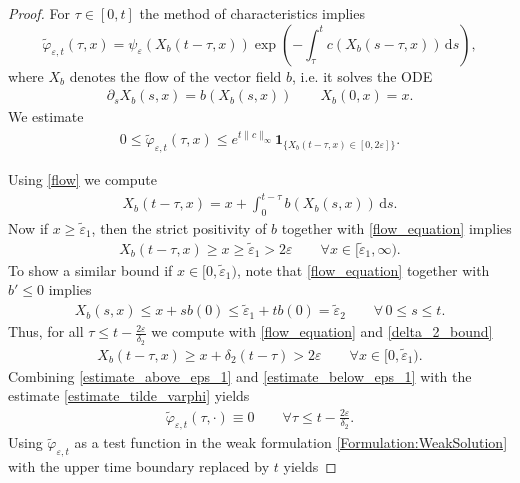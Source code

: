 \documentclass[12pt,a4paper]{amsart}
\newcommand{\ud}{\mathrm{d}}
\begin{document}
\begin{proof}
\noindent For $\tau\in [0,t]$ the method of characteristics implies
\[
\tilde \varphi_{\varepsilon,t}(\tau,x)
=
\psi_\varepsilon(X_b(t-\tau,x))
\exp\!\left(
-\int_\tau^t
c(X_b(s-\tau,x))\,\ud s
\right),
\]
where $X_b$ denotes the flow of the vector field $b$, i.e. it solves the ODE
	\begin{align}
    \label{flow}
	\partial_s X_b(s,x) = b(X_b(s, x)) \quad \quad X_b(0, x) = x.
	\end{align}
We estimate
\begin{align}
\label{estimate_tilde_varphi}
0\le
\tilde \varphi_{\varepsilon,t}(\tau,x)
\le
e^{t\|c\|_\infty}
\mathbf 1_{\{X_b(t-\tau,x)\in[0,2\varepsilon]\}}.
\end{align}

\noindent
Using \eqref{flow} we compute
\begin{align}
\label{flow_equation}
X_b(t-\tau,x)=x+\int_0^{t-\tau}b(X_b(s,x))\,\ud s.
\end{align}
Now if $x\geq\tilde \varepsilon_1$, then the strict positivity of $b$ together with \eqref{flow_equation} implies 
    \begin{align}
    \label{estimate_above_eps_1}
        X_b(t-\tau,x)\geq x\geq\tilde \varepsilon_1>2\varepsilon\qquad \forall x\in [\tilde\varepsilon_1,\infty).
    \end{align}
To show a similar bound if  $x\in[0,\tilde\varepsilon_1)$, note that  \eqref{flow_equation}  together with $b'\leq 0$ implies 
\begin{align*}
    X_b(s,x)\leq x+sb(0)\leq \tilde \varepsilon_1+tb(0)=\tilde \varepsilon_2\qquad \forall \,0\leq s\leq t.
    \end{align*}
Thus, for all $\tau\leq t-\frac {2\varepsilon}{\delta_2}$ we compute with \eqref{flow_equation} and \eqref{delta_2_bound}
\begin{align}
\label{estimate_below_eps_1}
X_b(t-\tau,x)\ge x+\delta_2(t-\tau)>2\varepsilon\qquad \forall x\in [0,\tilde \varepsilon_1).
\end{align}
Combining  \eqref{estimate_above_eps_1} and \eqref{estimate_below_eps_1} with the estimate \eqref{estimate_tilde_varphi} yields
    \begin{align*} 
\tilde \varphi_{\varepsilon,t}(\tau,\cdot)\equiv0 \qquad \forall \tau\leq t-\frac {2\varepsilon} {\delta_2}.
    \end{align*}
\noindent Using $\tilde \varphi_{\varepsilon,t}$ as a test function in the weak
formulation \eqref{Formulation:WeakSolution} with the upper time boundary replaced by $t$  yields

\end{proof}
\end{document}
